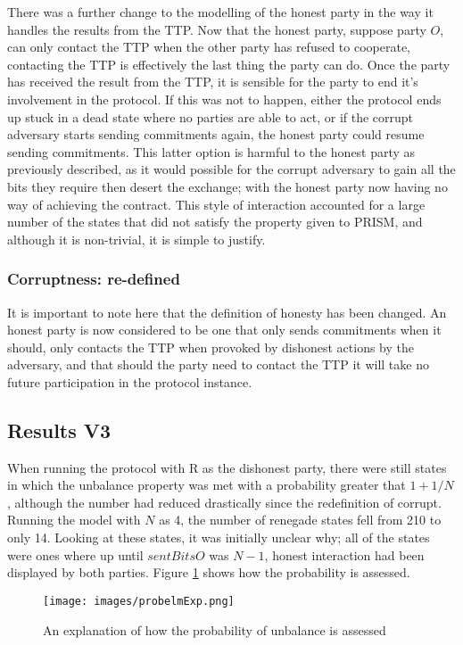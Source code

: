 \documentclass{l4proj}
\begin{document}
There was a further change to the modelling of the honest party in the way it handles the results from the TTP. Now that the honest party, suppose party $O$, can only contact the TTP when the other party has refused to cooperate, contacting the TTP is effectively the last thing the party can do. Once the party has received the result from the TTP, it is sensible for the party to end it's involvement in the protocol. If this was not to happen, either the protocol ends up stuck in a dead state where no parties are able to act, or if the corrupt adversary starts sending commitments again, the honest party could resume sending commitments. This latter option is harmful to the honest party as previously described, as it would possible for the corrupt adversary to gain all the bits they require then desert the exchange; with the honest party now having no way of achieving the contract. This style of interaction accounted for a large number of the states that did not satisfy the property given to PRISM, and although it is non-trivial, it is simple to justify. 

\subsubsection{Corruptness: re-defined}
It is important to note here that the definition of honesty has been changed. An honest party is now considered to be one that only sends commitments when it should, only contacts the TTP when provoked by dishonest actions by the adversary, and that should the party need to contact the TTP it will take no future participation in the protocol instance.


\subsection{Results V3}



When running the protocol with R as the dishonest party, there were still states in which the unbalance property was met with a probability greater that $1+1/N$, although the number had reduced drastically since the redefinition of corrupt. Running the model with $N$ as 4, the number of renegade states fell from 210 to only 14. Looking at these states, it was initially unclear why; all of the states were ones where up until $sentBitsO$ was $N-1$, honest interaction had been displayed by both parties. Figure \ref{finalProblem} shows how the probability is assessed.

\begin{figure}[ht!]
\centering
\texttt{[image: images/probelmExp.png]}
\caption{An explanation of how the probability of unbalance is assessed}
\label{finalProblem}
\end{figure}
\end{document}
